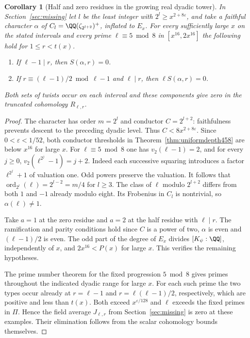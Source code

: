\documentclass[a4paper,11pt]{article}
\newtheorem{corollary}[proposition]{Corollary}
\theoremstyle{definition}
\theoremstyle{remark}
\numberwithin{equation}{section}
\begin{document}
\begin{corollary}[Half and zero residues in the growing real dyadic tower]\leavevmode
\label{cor:dyadicdepth458}
In Section~\ref{sec:missing} let \(l\) be the least integer with
\(2^l\ge x^{2+8\varepsilon}\), and take a faithful character
\(\alpha\) of \(C_l=\QQ(\zeta_{2^{l+2}})^+\), inflated to \(E_x\).
For every sufficiently large \(x\) on the stated intervals and every
prime \(\ell\equiv5\bmod8\) in \([x^{16},2x^{16}]\) the following
hold for \(1\le r<t(x)\).
\begin{enumerate}
\item If \(\ell-1\mid r\), then \(S(\alpha,r)=0\).
\item If \(r\equiv(\ell-1)/2\bmod{\ell-1}\) and \(\ell\mid r\),
      then \(\ell S(\alpha,r)=0\).
\end{enumerate}
Both sets of twists occur on each interval and these components
give zero in the truncated cohomology \(R_{\ell,r}\).
\end{corollary}
\begin{proof}
The character has order \(m=2^l\) and conductor \(C=2^{l+2}\):
faithfulness prevents descent to the preceding dyadic level.
Thus \(C<8x^{2+8\varepsilon}\). Since \(0<\varepsilon<1/52\),
both conductor thresholds in Theorem~\ref{thm:uniformdepth458}
are below \(x^{16}\) for large \(x\). For \(\ell\equiv5\bmod8\)
one has \(v_2(\ell-1)=2\), and for every \(j\ge0\),
\(v_2(\ell^{2^j}-1)=j+2\). Indeed each successive squaring
introduces a factor \(\ell^{2^j}+1\) of valuation one.
Odd powers preserve the valuation. It follows that
\(\operatorname{ord}_{2^l}(\ell)=2^{l-2}=m/4\) for \(l\ge3\).
The class of \(\ell\) modulo \(2^{l+2}\) differs from both
\(1\) and \(-1\) already modulo eight. Its Frobenius in \(C_l\)
is nontrivial, so \(\alpha(\ell)\ne1\).

Take \(a=1\) at the zero residue and \(a=2\) at the half
residue with \(\ell\mid r\). The ramification and parity
conditions hold since \(C\) is a power of two, \(\alpha\) is
even and \((\ell-1)/2\) is even. The odd part of the degree of
\(E_x\) divides \([K_\psi:\QQ]\), independently of \(x\),
and \(2x^{16}<P(x)\) for large \(x\). This verifies the
remaining hypotheses.

The prime number theorem for the fixed progression \(5\bmod8\)
gives primes throughout the indicated dyadic range for large
\(x\). For each such prime the two types occur already at
\(r=\ell-1\) and \(r=\ell(\ell-1)/2\), respectively, which are
positive and less than \(t(x)\). Both exceed \(x^{\varepsilon/128}\)
and \(\ell\) exceeds the fixed primes in \(\Pi\). Hence the field
average \(J_{\ell,r}\) from Section~\ref{sec:missing} is zero at
these examples. Their elimination follows from the scalar
cohomology bounds themselves.
\end{proof}
\end{document}
